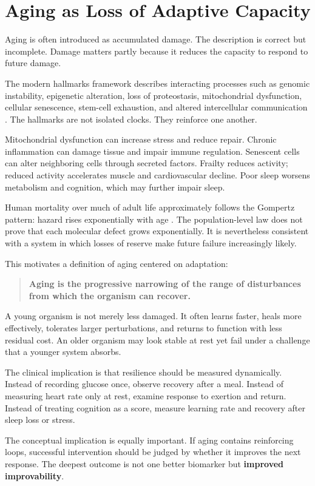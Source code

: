 \chapter{Aging as Loss of Adaptive Capacity}\label{chapter-9-aging-as-loss-of-adaptive-capacity}

Aging is often introduced as accumulated damage. The description is correct but incomplete. Damage matters partly because it reduces the capacity to respond to future damage.

The modern hallmarks framework describes interacting processes such as genomic instability, epigenetic alteration, loss of proteostasis, mitochondrial dysfunction, cellular senescence, stem-cell exhaustion, and altered intercellular communication \autocite{lopezotin2013hallmarks,lopezotin2023hallmarks}. The hallmarks are not isolated clocks. They reinforce one another.

Mitochondrial dysfunction can increase stress and reduce repair. Chronic inflammation can damage tissue and impair immune regulation. Senescent cells can alter neighboring cells through secreted factors. Frailty reduces activity; reduced activity accelerates muscle and cardiovascular decline. Poor sleep worsens metabolism and cognition, which may further impair sleep.

Human mortality over much of adult life approximately follows the Gompertz pattern: hazard rises exponentially with age \autocite{gompertz1825nature}. The population-level law does not prove that each molecular defect grows exponentially. It is nevertheless consistent with a system in which losses of reserve make future failure increasingly likely.

This motivates a definition of aging centered on adaptation:

\begin{quote}
\textbf{Aging is the progressive narrowing of the range of disturbances from which the organism can recover.}
\end{quote}

A young organism is not merely less damaged. It often learns faster, heals more effectively, tolerates larger perturbations, and returns to function with less residual cost. An older organism may look stable at rest yet fail under a challenge that a younger system absorbs.

The clinical implication is that resilience should be measured dynamically. Instead of recording glucose once, observe recovery after a meal. Instead of measuring heart rate only at rest, examine response to exertion and return. Instead of treating cognition as a score, measure learning rate and recovery after sleep loss or stress.

The conceptual implication is equally important. If aging contains reinforcing loops, successful intervention should be judged by whether it improves the next response. The deepest outcome is not one better biomarker but \textbf{improved improvability}.
